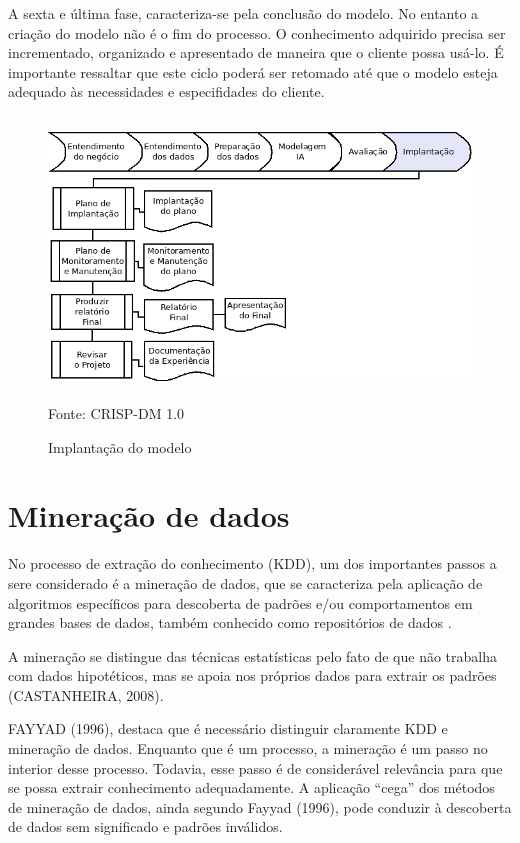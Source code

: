 
A sexta e última fase, caracteriza-se pela conclusão do modelo. No entanto a criação do modelo não é o fim do processo.
O conhecimento adquirido precisa ser incrementado, organizado e apresentado de maneira que o cliente possa usá-lo.
É importante ressaltar que este ciclo poderá ser retomado até que o modelo esteja adequado às necessidades e especifidades do cliente.

\begin{figure}[!ht]
\centering
\caption{Implantação do modelo}
\vspace{1mm}
\includegraphics[width=120mm, height=75mm]{Figuras/Cronograma/Inplantacao.png}\\
\tiny Fonte: CRISP-DM 1.0
\end{figure}




\pagebreak


\section{Mineração de dados}

No processo de extração do conhecimento (KDD), um dos importantes passos a sere considerado é a mineração de dados, que se caracteriza pela aplicação de algoritmos 
específicos para descoberta de padrões e/ou comportamentos em grandes bases de dados, também conhecido como repositórios de dados \cite{FayyadUeoutros}.

A mineração se distingue das técnicas estatísticas pelo fato de que  não trabalha com dados hipotéticos, mas se apoia nos próprios dados para extrair os padrões (CASTANHEIRA, 2008). 

FAYYAD (1996), destaca que é necessário distinguir claramente KDD e mineração de dados. Enquanto que é um processo, a mineração é um passo no interior desse processo. 
Todavia, esse passo é de considerável relevância para que se possa extrair conhecimento adequadamente. 
A aplicação “cega” dos métodos de mineração de dados, ainda segundo Fayyad (1996), pode conduzir à descoberta de dados sem significado e padrões inválidos. 

